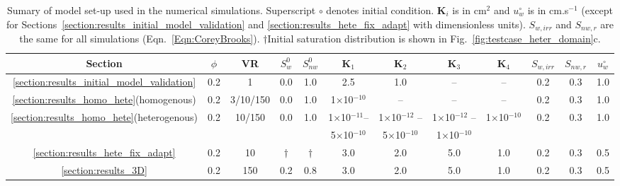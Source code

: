 \begin{landscape}
\begin{table}
  \begin{tabular}{c | c c  c  c  c  c  c  c  c  c   c}
    \hline
      {\bf Section} & $\phi$ & VR  & $S^{0}_{w}$ & $S^{0}_{nw}$ & $\mathbf{K}_{1}$ & $\mathbf{K}_{2}$ & $\mathbf{K}_{3}$ & $\mathbf{K}_{4}$ & $S_{w,irr}$ & $S_{nw,r}$ & $u^{\circ}_{w}$ \\ 
    \hline
     \ref{section:results_initial_model_validation} & 0.2 & 1 & 0.0 & 1.0 & 2.5 & 1.0 & -- & -- & 0.2 & 0.3 & 1.0 \\
     \ref{section:results_homo_hete}(homogenous)  & 0.2 & 3/10/150 & 0.0 & 1.0 & 1$\times$10$^{-10}$ & -- & -- & -- & 0.2 & 0.3 & 1.0  \\
     \ref{section:results_homo_hete}(heterogenous) & 0.2 & 10/150 & 0.0 & 1.0 & 1$\times$10$^{-11} $-- & 1$\times$10$^{-12}$ -- & 1$\times$10$^{-12}$ -- & 1$\times$10$^{-10}$ & 0.2  & 0.3 & 1.0 \\
      &   &  &  &  & 5$\times$10$^{-10}$ & 5$\times$10$^{-10}$ & 1$\times$10$^{-10}$  &  &  &  & \\
     \ref{section:results_hete_fix_adapt}  & 0.2 & 10 & $\dagger$ & $\dagger$  & 3.0 & 2.0 & 5.0 & 1.0 & 0.2 & 0.3 & 0.5  \\
     \ref{section:results_3D}  & 0.2 & 150 & 0.2 & 0.8 & 3.0 & 2.0 & 5.0 & 1.0 & 0.2  & 0.3 & 0.5  \\
     \hline
   \end{tabular}
   \caption{Sumary of model set-up used in the numerical simulations. Superscript $\circ$ denotes initial condition. $\mathbf{K}_{i}$ is in cm$^{2}$ and $u^{\circ}_{w}$ is in cm.s$^{-1}$ (except for Sections~\ref{section:results_initial_model_validation} and \ref{section:results_hete_fix_adapt} with dimensionless units). $S_{w,irr}$ and $S_{nw,r}$ are the same for all simulations (Eqn.~\ref{Eqn:CoreyBrooks}). $\dagger$Initial saturation distribution is shown in Fig.~\ref{fig:testcase_heter_domain}c.}
\label{table:setup}
\end{table}
\end{landscape}
\clearpage


